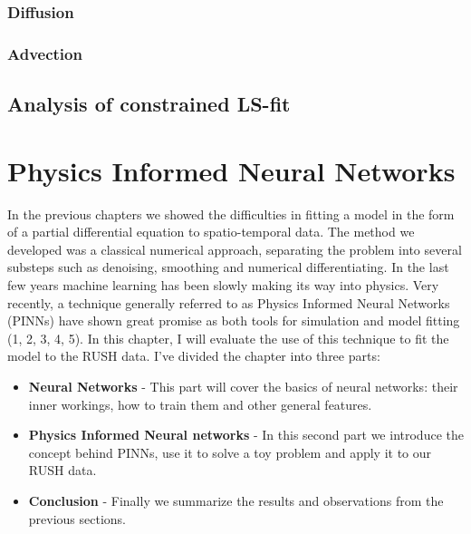 \documentclass[12pt,a4paper,]{harvard-thesis}
\providecommand{\tightlist}{%
  \setlength{\itemsep}{0pt}\setlength{\parskip}{0pt}}
\begin{document}
\hypertarget{diffusion}{%
\subsection{Diffusion}\label{diffusion}}

\hypertarget{advection}{%
\subsection{Advection}\label{advection}}

\hypertarget{analysis-of-constrained-ls-fit}{%
\section{Analysis of constrained
LS-fit}\label{analysis-of-constrained-ls-fit}}

\hypertarget{physics-informed-neural-networks}{%
\chapter{Physics Informed Neural
Networks}\label{physics-informed-neural-networks}}

In the previous chapters we showed the difficulties in fitting a model
in the form of a partial differential equation to spatio-temporal data.
The method we developed was a classical numerical approach, separating
the problem into several substeps such as denoising, smoothing and
numerical differentiating. In the last few years machine learning has
been slowly making its way into physics. Very recently, a technique
generally referred to as Physics Informed Neural Networks (PINNs) have
shown great promise as both tools for simulation and model fitting (1,
2, 3, 4, 5). In this chapter, I will evaluate the use of this technique
to fit the model to the RUSH data. I've divided the chapter into three
parts:

\begin{itemize}
\tightlist
\item
  \textbf{Neural Networks} - This part will cover the basics of neural
  networks: their inner workings, how to train them and other general
  features.
\item
  \textbf{Physics Informed Neural networks} - In this second part we
  introduce the concept behind PINNs, use it to solve a toy problem and
  apply it to our RUSH data.
\item
  \textbf{Conclusion} - Finally we summarize the results and
  observations from the previous sections.
\end{itemize}
\end{document}
